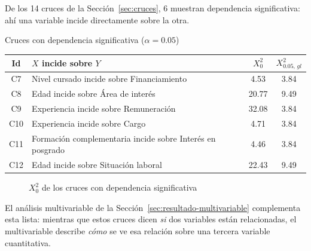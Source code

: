 De los 14 cruces de la Sección~\ref{sec:cruces}, 6 muestran dependencia significativa: ahí una variable incide directamente sobre la otra.

\begin{mitabla}{Cruces con dependencia significativa ($\alpha = 0.05$)}
\begin{tabular}{clcc}
\toprule
Id & $X$ incide sobre $Y$ & $X_0^2$ & $X_{0.05,\,gl}^2$ \\
\midrule
C7 & Nivel cursado incide sobre Financiamiento & 4.53 & 3.84 \\
C8 & Edad incide sobre Área de interés & 20.77 & 9.49 \\
C9 & Experiencia incide sobre Remuneración & 32.08 & 3.84 \\
C10 & Experiencia incide sobre Cargo & 4.71 & 3.84 \\
C11 & Formación complementaria incide sobre Interés en posgrado & 4.46 & 3.84 \\
C12 & Edad incide sobre Situación laboral & 22.43 & 9.49 \\
\bottomrule
\end{tabular}
\end{mitabla}

\begin{figure}[H]
\centering
\caption{$X_0^2$ de los cruces con dependencia significativa}
\end{figure}

El análisis multivariable de la Sección~\ref{sec:resultado-multivariable} complementa esta lista: mientras que estos cruces dicen \emph{si} dos variables están relacionadas, el multivariable describe \emph{cómo} se ve esa relación sobre una tercera variable cuantitativa.

